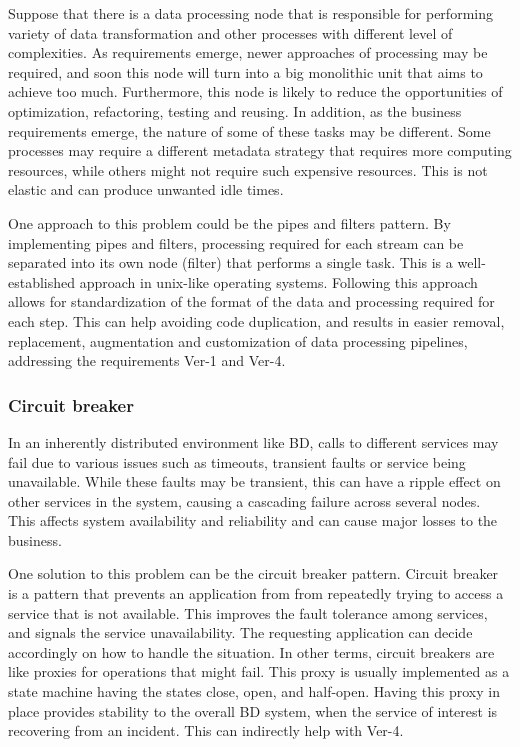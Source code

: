 \documentclass[a4paper,11pt,article,oneside]{memoir}
\begin{document}
Suppose that there is a data processing node that is responsible for performing variety of data transformation and other processes with different level of complexities. As requirements emerge, newer approaches of processing may be required, and soon this node will turn into a big monolithic unit that aims to achieve too much. Furthermore, this node is likely to reduce the opportunities of optimization, refactoring, testing and reusing. In addition, as the business requirements emerge, the nature of some of these tasks may be different. Some processes may require a different metadata strategy that requires more computing resources, while others might not require such expensive resources. This is not elastic and can produce unwanted idle times. 

One approach to this problem could be the pipes and filters pattern. By implementing pipes and filters, processing required for each stream can be separated into its own node (filter) that performs a single task. This is a well-established approach in unix-like operating systems. Following this approach allows for standardization of the format of the data and processing required for each step. This can help avoiding code duplication, and results in easier removal, replacement, augmentation and customization of data processing pipelines, addressing the requirements Ver-1 and Ver-4.

\subsubsection{Circuit breaker}
 
In an inherently distributed environment like BD, calls to different services may fail due to various issues such as timeouts, transient faults or service being unavailable. While these faults may be transient, this can have a ripple effect on other services in the system, causing a cascading failure across several nodes. This affects system availability and reliability and can cause major losses to the business. 

One solution to this problem can be the circuit breaker pattern. Circuit breaker is a pattern that prevents an application from from repeatedly trying to access a service that is not available. This improves the fault tolerance among services, and signals the service unavailability. The requesting application can decide accordingly on how to handle the situation. In other terms, circuit breakers are like proxies for operations that might fail. This proxy is usually implemented as a state machine having the states close, open, and half-open. Having this proxy in place provides stability to the overall BD system, when the service of interest is recovering from an incident. This can indirectly help with Ver-4.
\end{document}
